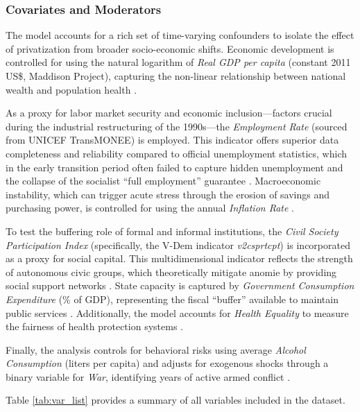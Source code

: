 \documentclass[12pt]{article}
\begin{document}
\subsubsection*{Covariates and Moderators}
The model accounts for a rich set of time-varying confounders to isolate the effect of privatization from broader socio-economic shifts. 
Economic development is controlled for using the natural logarithm of \textit{Real GDP per capita} (constant 2011 US\$, Maddison Project), 
capturing the non-linear relationship between national wealth and population health \citep{Hamm2012, Stuckler2009}.

As a proxy for labor market security and economic inclusion—factors crucial during the industrial restructuring of the 1990s—the 
\textit{Employment Rate} (sourced from UNICEF TransMONEE) is employed. This indicator offers superior data completeness and reliability 
compared to official unemployment statistics, which in the early transition period often failed to capture hidden unemployment and the 
collapse of the socialist ``full employment'' guarantee \citep{Cornia2016, UNECE2004}. Macroeconomic instability, which can trigger acute 
stress through the erosion of savings and purchasing power, is controlled for using the annual \textit{Inflation Rate} \citep{B_Brainerd1998, 
Treisman2010}.

To test the buffering role of formal and informal institutions, the \textit{Civil Society Participation Index} (specifically, the V-Dem indicator \textit{v2csprtcpt}) 
is incorporated as a proxy for social capital. This multidimensional indicator reflects the strength of autonomous civic groups, which theoretically 
mitigate anomie by providing social support networks \citep{Stuckler2009, Scheiring2018}. State capacity is captured by \textit{Government Consumption 
Expenditure} (\% of GDP), representing the fiscal ``buffer'' available to maintain public services \citep{Hamm2012, Cieslik2018}. Additionally, the model 
accounts for \textit{Health Equality} to measure the fairness of health protection systems 
\citep{Cornia2016}.

Finally, the analysis controls for behavioral risks using average \textit{Alcohol Consumption} (liters per capita) and adjusts for exogenous shocks 
through a binary variable for \textit{War}, identifying years of active armed conflict \citep{Stuckler2009, Bhattacharya2013}.


Table \ref{tab:var_list} provides a summary of all variables included in the dataset.
\end{document}
